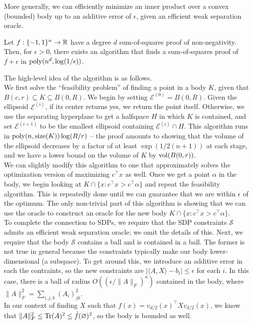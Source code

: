 	More generally, we can efficiently minimize an inner product over a convex (bounded) body up to an additive error of $\epsilon$, given an efficient weak separation oracle.

	\begin{ftheo}
		Let $f : \{-1,1\}^n \to \mathbb{R}$ have a degree $d$ sum-of-squares proof of non-negativity. Then, for $\epsilon > 0$, there exists an algorithm that finds a sum-of-squares proof of $f+\epsilon$ in $\operatorname{poly}(n^d,\log(1/\epsilon))$.
	\end{ftheo}

	The high-level idea of the algorithm is as follows.\\
	We first solve the ``feasibility problem'' of finding a point in a body $K$, given that $B(c,r) \subseteq K \subseteq B(0,R)$. We begin by setting $\mathcal{E}^{(0)} = B(0,R)$. Given the ellipsoid $\mathcal{E}^{(i)}$, if its center returns \textsf{yes}, we return the point itself. Otherwise, we use the separating hyperplane to get a halfspace $H$ in which $K$ is contained, and set $\mathcal{E}^{(i+1)}$ to be the smallest ellipsoid containing $\mathcal{E}^{(i)} \cap H$. This algorithm runs in $\operatorname{poly}(n,\operatorname{size}(K)) \log(R/r)$ -- the proof amounts to showing that the volume of the ellipsoid decreases by a factor of at least $\exp(1/2(n+1))$ at each stage, and we have a lower bound on the volume of $K$ by $\operatorname{vol}(B(0,r))$.\\
	We can slightly modify this algorithm to one that approximately solves the optimization version of maximizing $c^\top x$ as well. Once we get a point $\alpha$ in the body, we begin looking at $K \cap \{x : c^\top x > c^\top \alpha\}$ and repeat the feasibility algorithm. This is repeatedly done until we can guarantee that we are within $\epsilon$ of the optimum. The only non-trivial part of this algorithm is showing that we can use the oracle to construct an oracle for the new body $K \cap \{x : c^\top x > c^\top \alpha\}$.\\
	To complete the connection to SDPs, we require that the SDP constraints $\mathcal{S}$ admits an efficient weak separation oracle; we omit the details of this. Next, we require that the body $\mathcal{S}$ contains a ball and is contained in a ball. The former is not true in general because the constraints typically make our body lower-dimensional (a subspace). To get around this, we introduce an additive error in each the contraints, so the new constraints are $|\langle A,X\rangle - b_i| \le \epsilon$ for each $i$. In this case, there is a ball of radius $O( (\epsilon/\|A\|_F)^n )$ contained in the body, where $\|A\|_F^2 = \sum_{i,j,k} (A_i)_{jk}^2$.\\
	In our context of finding $X$ such that $f(x) = v_{d/2}(x)^\top X v_{d/2}(x)$, we know that $\|A\|_F^2 \le \operatorname{Tr}(A)^2 \le \hat{f}(\varnothing)^2$, so the body is bounded as well.\\

